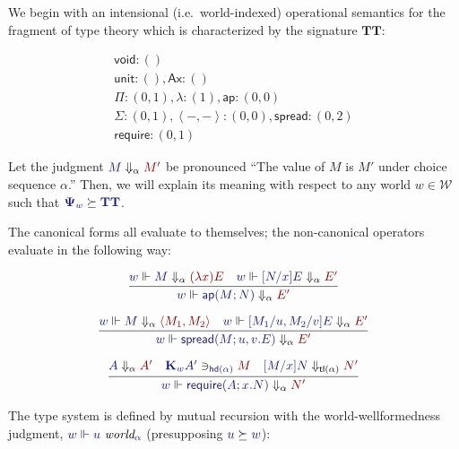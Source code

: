 \documentclass[11pt]{amsart}
\theoremstyle{definition}
\theoremstyle{remark}
\numberwithin{equation}{section}
\def\InputModeColorName{MidnightBlue}
\def\OutputModeColorName{Maroon}
\newcommand\IMode[1]{{\color{\InputModeColorName}{#1}}}
\newcommand\OMode[1]{{\color{\OutputModeColorName}{#1}}}
\newcommand\Force[2]{\IMode{#1}\Vdash #2}
\newcommand\IsWorld[2]{\IMode{#1}\ \textit{world}_\IMode{#2}}
\newcommand\Sig[1]{\mathbf{\Psi}_{#1}}
\newcommand\SigTT{\mathbf{TT}}
\newcommand\TyVoid{\mathsf{void}}
\newcommand\TyUnit{\mathsf{unit}}
\newcommand\Ax{\mathsf{Ax}}
\newcommand\SuccEq[2]{\IMode{#1}\succeq\IMode{#2}}
\newcommand\Pair[2]{\left\langle #1, #2 \right\rangle}
\newcommand\Lam[2]{(\lambda #1)#2}
\newcommand\Ap[2]{\mathsf{ap}(#1; #2)}
\newcommand\Spread[4]{\mathsf{spread}(#1; #2,#3.#4)}
\newcommand\Require[3]{\mathsf{require}(#1; #2.#3)}
\newcommand\Eval[3]{\IMode{#2}\Downarrow_{#1}\OMode{#3}}
\newcommand\Worlds{\mathcal{W}}
\newcommand\Witnesses[1]{\mathbf{K}_{#1}}
\newcommand\OpRequire{\mathsf{require}}
\begin{document}
We begin with an intensional (i.e.\ world-indexed) operational semantics for
the fragment of type theory which is characterized by the signature
$\SigTT$:

\begin{gather*}
  \TyVoid:()\\
  \TyUnit:(), \Ax:()\\
  \Pi : (0,1), \lambda : (1), \mathsf{ap} : (0,0)\\
  \Sigma : (0,1), \Pair{-}{-} : (0,0), \mathsf{spread} : (0,2)\\
  \OpRequire : (0,1)
\end{gather*}

Let the judgment $\Eval{\alpha}{M}{M'}$ be pronounced ``The value of $M$ is
$M'$ under choice sequence $\alpha$.'' Then, we will explain its meaning with
respect to any world $w\in\Worlds$ such that $\SuccEq{\Sig{w}}{\SigTT}$.

The canonical forms all evaluate to themselves; the non-canonical operators
evaluate in the following way:

\begin{gather*}
  \infer{
    \Force{w}{\Eval{\alpha}{\Ap{M}{N}}{E'}}
  }{
    \Force{w}{\Eval{\alpha}{M}{\Lam{x}{E}}} &
    \Force{w}{\Eval{\alpha}{[N/x]E}{E'}}
  }\\[6pt]
  \infer{
    \Force{w}{\Eval{\alpha}{\Spread{M}{u}{v}{E}}{E'}}
  }{
    \Force{w}{\Eval{\alpha}{M}{\Pair{M_1}{M_2}}} &
    \Force{w}{\Eval{\alpha}{[M_1/u, M_2/v]E}{E'}}
  }\\[6pt]
  \infer{
    \Force{w}{\Eval{\alpha}{\Require{A}{x}{N}}{N'}}
  }{
    \Eval{\alpha}{A}{A'} &
    \IMode{\Witnesses{w}A'}\ni_\IMode{\mathsf{hd}(\alpha)}\OMode{M} &
    \Eval{\mathsf{tl}(\alpha)}{[M/x]N}{N'}
  }
\end{gather*}

The type system is defined by mutual recursion with the world-wellformedness
judgment, $\Force{w}{\IsWorld{u}{\alpha}}$ (presupposing $\SuccEq{u}{w}$):
\end{document}
